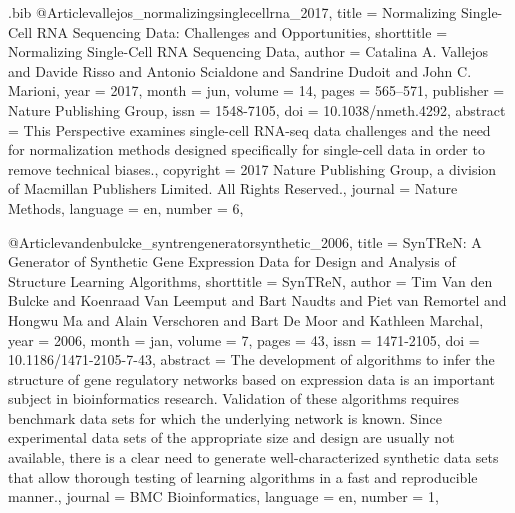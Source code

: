 \documentclass[
  table,
  10pt,
  a4paper]{article}
\begin{document}
\begin{filecontents}{\jobname.bib}
@Article{vallejos_normalizingsinglecellrna_2017,
	title = {Normalizing Single-Cell {{RNA}} Sequencing Data: Challenges and Opportunities},
	shorttitle = {Normalizing Single-Cell {{RNA}} Sequencing Data},
	author = {Catalina A. Vallejos and Davide Risso and Antonio Scialdone and Sandrine Dudoit and John C. Marioni},
	year = {2017},
	month = {jun},
	volume = {14},
	pages = {565--571},
	publisher = {{Nature Publishing Group}},
	issn = {1548-7105},
	doi = {10.1038/nmeth.4292},
	abstract = {This Perspective examines single-cell RNA-seq data challenges and the need for normalization methods designed specifically for single-cell data in order to remove technical biases.},
	copyright = {2017 Nature Publishing Group, a division of Macmillan Publishers Limited. All Rights Reserved.},
	journal = {Nature Methods},
	language = {en},
	number = {6},
}

@Article{vandenbulcke_syntrengeneratorsynthetic_2006,
	title = {{{SynTReN}}: A Generator of Synthetic Gene Expression Data for Design and Analysis of Structure Learning Algorithms},
	shorttitle = {{{SynTReN}}},
	author = {Tim {Van den Bulcke} and Koenraad {Van Leemput} and Bart Naudts and Piet {van Remortel} and Hongwu Ma and Alain Verschoren and Bart {De Moor} and Kathleen Marchal},
	year = {2006},
	month = {jan},
	volume = {7},
	pages = {43},
	issn = {1471-2105},
	doi = {10.1186/1471-2105-7-43},
	abstract = {The development of algorithms to infer the structure of gene regulatory networks based on expression data is an important subject in bioinformatics research. Validation of these algorithms requires benchmark data sets for which the underlying network is known. Since experimental data sets of the appropriate size and design are usually not available, there is a clear need to generate well-characterized synthetic data sets that allow thorough testing of learning algorithms in a fast and reproducible manner.},
	journal = {BMC Bioinformatics},
	language = {en},
	number = {1},
}


\end{filecontents}
\end{document}
